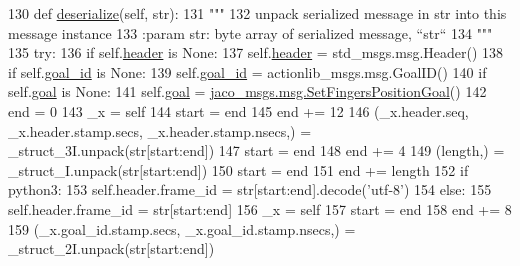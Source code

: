 \begin{DoxyCode}
130   \textcolor{keyword}{def }\hyperlink{classjaco__msgs_1_1msg_1_1__SetFingersPositionActionGoal_1_1SetFingersPositionActionGoal_a00ce8a4089881c2874855c061913c9b4}{deserialize}(self, str):
131     \textcolor{stringliteral}{"""}
132 \textcolor{stringliteral}{    unpack serialized message in str into this message instance}
133 \textcolor{stringliteral}{    :param str: byte array of serialized message, ``str``}
134 \textcolor{stringliteral}{    """}
135     \textcolor{keywordflow}{try}:
136       \textcolor{keywordflow}{if} self.\hyperlink{classjaco__msgs_1_1msg_1_1__SetFingersPositionActionGoal_1_1SetFingersPositionActionGoal_aaab21a95f77c604078e24ad69f6c28c6}{header} \textcolor{keywordflow}{is} \textcolor{keywordtype}{None}:
137         self.\hyperlink{classjaco__msgs_1_1msg_1_1__SetFingersPositionActionGoal_1_1SetFingersPositionActionGoal_aaab21a95f77c604078e24ad69f6c28c6}{header} = std\_msgs.msg.Header()
138       \textcolor{keywordflow}{if} self.\hyperlink{classjaco__msgs_1_1msg_1_1__SetFingersPositionActionGoal_1_1SetFingersPositionActionGoal_a8336121df2ce21765eb1e1e965fc01e5}{goal\_id} \textcolor{keywordflow}{is} \textcolor{keywordtype}{None}:
139         self.\hyperlink{classjaco__msgs_1_1msg_1_1__SetFingersPositionActionGoal_1_1SetFingersPositionActionGoal_a8336121df2ce21765eb1e1e965fc01e5}{goal\_id} = actionlib\_msgs.msg.GoalID()
140       \textcolor{keywordflow}{if} self.\hyperlink{classjaco__msgs_1_1msg_1_1__SetFingersPositionActionGoal_1_1SetFingersPositionActionGoal_a6914ac9af1a3f57743ec45d16f637698}{goal} \textcolor{keywordflow}{is} \textcolor{keywordtype}{None}:
141         self.\hyperlink{classjaco__msgs_1_1msg_1_1__SetFingersPositionActionGoal_1_1SetFingersPositionActionGoal_a6914ac9af1a3f57743ec45d16f637698}{goal} = \hyperlink{classjaco__msgs_1_1msg_1_1__SetFingersPositionGoal_1_1SetFingersPositionGoal}{jaco\_msgs.msg.SetFingersPositionGoal}()
142       end = 0
143       \_x = self
144       start = end
145       end += 12
146       (\_x.header.seq, \_x.header.stamp.secs, \_x.header.stamp.nsecs,) = \_struct\_3I.unpack(str[start:end])
147       start = end
148       end += 4
149       (length,) = \_struct\_I.unpack(str[start:end])
150       start = end
151       end += length
152       \textcolor{keywordflow}{if} python3:
153         self.header.frame\_id = str[start:end].decode(\textcolor{stringliteral}{'utf-8'})
154       \textcolor{keywordflow}{else}:
155         self.header.frame\_id = str[start:end]
156       \_x = self
157       start = end
158       end += 8
159       (\_x.goal\_id.stamp.secs, \_x.goal\_id.stamp.nsecs,) = \_struct\_2I.unpack(str[start:end])

\end{DoxyCode}
